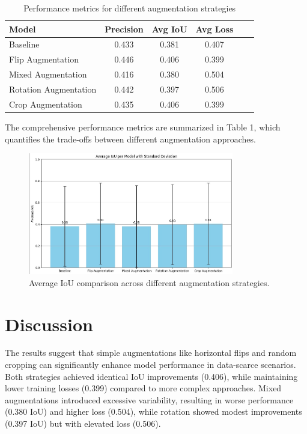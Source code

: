 \documentclass[12pt]{article}
\begin{document}
\begin{table}[h!]
\centering
\begin{tabular}{lccccc}
\toprule
\textbf{Model} & \textbf{Precision} & \textbf{Avg IoU} & \textbf{Avg Loss} \\
\midrule
Baseline & 0.433 & 0.381 & 0.407 \\
Flip Augmentation & 0.446 & 0.406 & 0.399 \\
Mixed Augmentation & 0.416 & 0.380 & 0.504 \\
Rotation Augmentation & 0.442 & 0.397 & 0.506 \\
Crop Augmentation & 0.435 & 0.406 & 0.399 \\
\bottomrule
\end{tabular}
\caption{Performance metrics for different augmentation strategies}
\end{table}

The comprehensive performance metrics are summarized in Table 1, which quantifies the trade-offs between different augmentation approaches.

\begin{figure}[H]
    \centering
    \includegraphics[width=0.8\textwidth]{avg_iou_per_model.jpg}
    \caption{Average IoU comparison across different augmentation strategies.}
    \label{fig:avg_iou}
\end{figure}


\section{Discussion}
The results suggest that simple augmentations like horizontal flips and random cropping can significantly enhance model performance in data-scarce scenarios. Both strategies achieved identical IoU improvements (0.406), while maintaining lower training losses (0.399) compared to more complex approaches. Mixed augmentations introduced excessive variability, resulting in worse performance (0.380 IoU) and higher loss (0.504), while rotation showed modest improvements (0.397 IoU) but with elevated loss (0.506).
\end{document}
